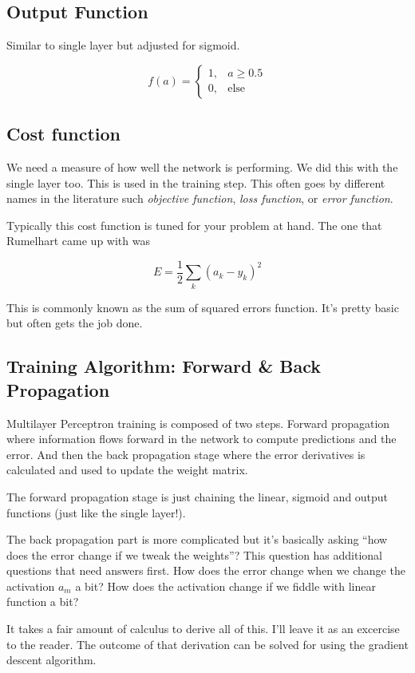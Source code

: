 \documentclass[letterpaper,12pt]{article}
\begin{document}
\subsection{Output Function}

Similar to single layer but adjusted for sigmoid.

\[
    f(a) =
    \begin{cases}
        1, & a \ge 0.5\\
        0, & \text{else}
    \end{cases}
\]

\subsection{Cost function}

We need a measure of how well the network is performing. We did this with the
single layer too. This is used in the training step. This often goes by
different names in the literature such \emph{objective function}, \emph{loss
function}, or \emph{error function}.

Typically this cost function is tuned for your problem at hand. The one that
Rumelhart came up with was

\[
    E = \frac{1}{2} \sum_{k} {(a_k - y_k)}^2
\]

This is commonly known as the sum of squared errors function. It's pretty basic
but often gets the job done.

\subsection{Training Algorithm: Forward \& Back Propagation}

Multilayer Perceptron training is composed of two steps. Forward propagation
where information flows forward in the network to compute predictions and the
error. And then the back propagation stage where the error derivatives is
calculated and used to update the weight matrix.

The forward propagation stage is just chaining the linear, sigmoid and output
functions (just like the single layer!).

The back propagation part is more complicated but it's basically asking ``how
does the error change if we tweak the weights''? This question has additional
questions that need answers first. How does the error change when we change
the activation $a_m$ a bit?  How does the activation change if we fiddle with
linear function a bit?

It takes a fair amount of calculus to derive all of this. I'll leave it as an
excercise to the reader. The outcome of that derivation can be solved for using
the gradient descent algorithm.
\end{document}
